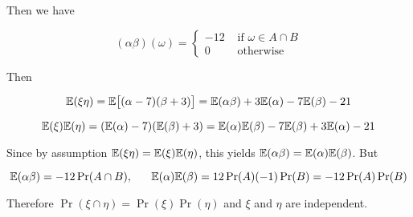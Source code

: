 Then we have

\[
(\alpha \beta)(\omega) = \begin{cases} 
      -12 & \text{ if } \omega \in A \cap B \\
      0 &  \text{ otherwise} 
   \end{cases}
\]

Then

\[
\E(\xi \eta) = \E\big[ (\alpha - 7)(\beta + 3)\big] = \E(\alpha \beta) + 3 \E(\alpha) - 7 \E(\beta) - 21
\]

\[
\E(\xi) \E(\eta) = (\E(\alpha) - 7) (\E(\beta) + 3) = \E(\alpha) \E(\beta) - 7 \E(\beta) + 3 \E(\alpha) - 21
\]

Since by assumption \( \E(\xi \eta)  = \E(\xi) \E(\eta) \), this yields \(\E(\alpha \beta) = \E(\alpha) \E(\beta) \). But

\[
\E(\alpha \beta) = -12 \Pr(A \cap B), \ \ \ \ \ \E(\alpha) \E(\beta) = 12 \Pr(A) (-1) \Pr(B) = -12\Pr(A)\Pr(B)
\]

Therefore \(\Pr(\xi \cap \eta) = \Pr(\xi) \Pr(\eta)\) and \(\xi\) and \(\eta\) are independent.

%
%
%
%
%
%
%
%

